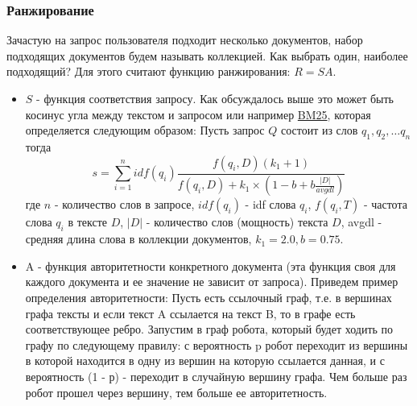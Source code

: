\subsubsection {Ранжирование}
Зачастую на запрос пользователя подходит несколько документов, набор подходящих документов будем называть коллекцией. Как выбрать один, наиболее подходящий? Для этого считают функцию ранжирования: $R = S A$.
\begin{itemize}
\item $S$ - функция соответствия запросу. Как обсуждалось выше это может быть косинус угла между текстом и запросом или например \href{https://clck.ru/pvLYk}{BM25}, которая определяется следующим образом: Пусть запрос $Q$ состоит из слов $q_1, q_2, \dots q_n$ тогда $$ s = \sum_{i = 1}^n idf (q_i)
 \frac {f(q_i, D)(k_1 + 1)}{f(q_i, D) + k_1 \times \left(1 - b + b \frac{|D|}{avgdl} \right)} $$ где $n$ - количество слов в запросе, $idf(q_i)$ - idf слова $q_i$, $f(q_i, T)$ - частота слова $q_i$ в тексте $D$, $|D|$ - количество слов (мощность) текста $D$, avgdl - средняя длина слова в коллекции документов, $k_1 = 2.0, b = 0.75$. 
\item A - функция авторитетности конкретного документа (эта функция своя для каждого документа и ее значение не зависит от запроса). Приведем пример определения авторитетности: Пусть есть ссылочный граф, т.е. в вершинах графа тексты и если текст A ссылается на текст B, то в графе есть соответствующее ребро. Запустим в граф робота, который будет ходить по графу по следующему правилу: с вероятность p робот переходит из вершины в которой находится в одну из вершин на которую ссылается данная, и с вероятность (1 - р) - переходит в случайную вершину графа. Чем больше раз робот прошел через вершину, тем больше ее авторитетность.
\end {itemize}



